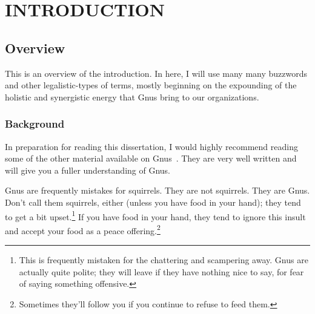 %
%
%
%
%
%
%
%
%
%


%
%

\chapter{INTRODUCTION}

\section{Overview}

This is an overview of the introduction.  In here, I will use many
many buzzwords and other legalistic-types of terms, mostly beginning on
the expounding of the holistic and synergistic energy that Gnus bring
to our organizations.

\subsection{Background}

In preparation for reading this dissertation\cite{benard_implementation_2014}, I would highly recommend
reading some of the other material available on
Gnus~\citep{gnus98:_gerry_ganst,greenfield96:_gettin_know_gnu}.  They
are very well written and will give you a fuller understanding of
Gnus.

Gnus are frequently mistakes for squirrels.  They are not squirrels.
They are Gnus.  Don't call them squirrels, either (unless you have
food in your hand); they tend to get a bit upset.\footnote{This is
  frequently mistaken for the chattering and scampering away.  Gnus
  are actually quite polite; they will leave if they have nothing nice
  to say, for fear of saying something offensive.}  If you have food
in your hand, they tend to ignore this insult and accept your food as
a peace offering.\footnote{Sometimes they'll follow you if you continue
to refuse to feed them.}

